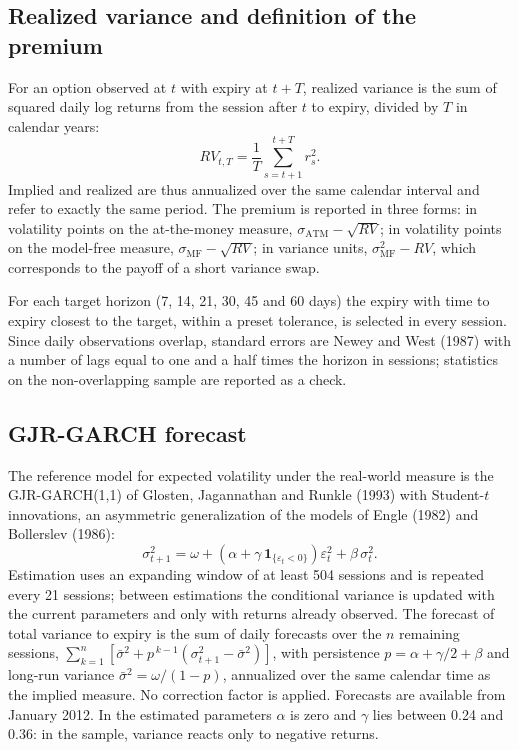 \documentclass[11pt,a4paper]{article}
\begin{document}
\subsection{Realized variance and definition of the premium}

For an option observed at $t$ with expiry at $t+T$, realized variance is the sum of squared daily log returns from the session after $t$ to expiry, divided by $T$ in calendar years:
\begin{equation}
RV_{t,T} = \frac{1}{T}\sum_{s=t+1}^{t+T} r_s^2 .
\end{equation}
Implied and realized are thus annualized over the same calendar interval and refer to exactly the same period. The premium is reported in three forms: in volatility points on the at-the-money measure, $\sigma_{\mathrm{ATM}} - \sqrt{RV}$; in volatility points on the model-free measure, $\sigma_{\mathrm{MF}} - \sqrt{RV}$; in variance units, $\sigma^2_{\mathrm{MF}} - RV$, which corresponds to the payoff of a short variance swap.

For each target horizon (7, 14, 21, 30, 45 and 60 days) the expiry with time to expiry closest to the target, within a preset tolerance, is selected in every session. Since daily observations overlap, standard errors are Newey and West (1987) with a number of lags equal to one and a half times the horizon in sessions; statistics on the non-overlapping sample are reported as a check.

\subsection{GJR-GARCH forecast}

The reference model for expected volatility under the real-world measure is the GJR-GARCH(1,1) of Glosten, Jagannathan and Runkle (1993) with Student-$t$ innovations, an asymmetric generalization of the models of Engle (1982) and Bollerslev (1986):
\begin{equation}
\sigma^2_{t+1} = \omega + \left(\alpha + \gamma\,\mathbf{1}_{\{\varepsilon_t<0\}}\right)\varepsilon_t^2 + \beta\,\sigma_t^2 .
\end{equation}
Estimation uses an expanding window of at least 504 sessions and is repeated every 21 sessions; between estimations the conditional variance is updated with the current parameters and only with returns already observed. The forecast of total variance to expiry is the sum of daily forecasts over the $n$ remaining sessions, $\sum_{k=1}^{n}\left[\bar\sigma^2 + p^{\,k-1}(\sigma^2_{t+1}-\bar\sigma^2)\right]$, with persistence $p=\alpha+\gamma/2+\beta$ and long-run variance $\bar\sigma^2=\omega/(1-p)$, annualized over the same calendar time as the implied measure. No correction factor is applied. Forecasts are available from January 2012. In the estimated parameters $\alpha$ is zero and $\gamma$ lies between 0.24 and 0.36: in the sample, variance reacts only to negative returns.
\end{document}
